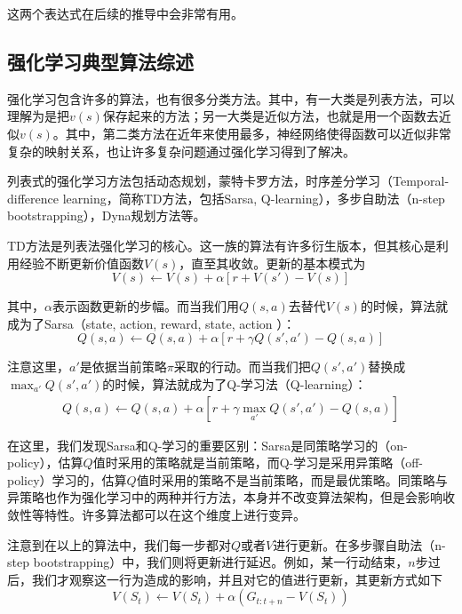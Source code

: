     \par 这两个表达式在后续的推导中会非常有用。
    
  \subsection{强化学习典型算法综述}
      强化学习包含许多的算法，也有很多分类方法。其中，有一大类是列表方法，可以理解为是把$v(s)$保存起来的方法；另一大类是近似方法，也就是用一个函数去近似$v(s)$\cite{Sutton_book}。其中，第二类方法在近年来使用最多，神经网络使得函数可以近似非常复杂的映射关系，也让许多复杂问题通过强化学习得到了解决。\par
      列表式的强化学习方法包括动态规划\cite{Bellman_DP}，蒙特卡罗方法，时序差分学习（Temporal-difference learning，简称TD方法，包括Sarsa\cite{Sutton_book}, Q-learning\cite{Q_learning}）\cite{Sutton_problem_formulation}，多步自助法\cite{n_step_bootstrapping}（n-step bootstrapping），Dyna规划方法\cite{Sutton_book}等。\par
      TD方法是列表法强化学习的核心。这一族的算法有许多衍生版本，但其核心是利用经验不断更新价值函数$V(s)$，直至其收敛。更新的基本模式为
      $$ V(s) \gets V(s) + \alpha [r + V(s') - V(s)] $$
      \par 其中，$\alpha$表示函数更新的步幅。而当我们用$Q(s, a)$去替代$V(s)$的时候，算法就成为了Sarsa（state, action, reward, state, action \cite{deepRL_overview}）：
      $$ Q(s, a) \gets Q(s, a) + \alpha [r + \gamma Q(s', a') - Q(s, a)] $$
      \par 注意这里，$a'$是依据当前策略$\pi$采取的行动。而当我们把$Q(s', a')$替换成$\max_{a'} Q(s', a')$的时候，算法就成为了Q-学习法（Q-learning）：
      \begin{align}
      \label{eq:Q_learning}
        Q(s, a) \gets Q(s, a) + \alpha [r + \gamma \max_{a'} Q(s', a') - Q(s, a)]
      \end{align}
      \par 在这里，我们发现Sarsa和Q-学习的重要区别：Sarsa是同策略学习的（on-policy），估算$Q$值时采用的策略就是当前策略，而Q-学习是采用异策略（off-policy）学习的，估算$Q$值时采用的策略不是当前策略，而是最优策略。同策略与异策略也作为强化学习中的两种并行方法，本身并不改变算法架构，但是会影响收敛性等特性。许多算法都可以在这个维度上进行变异。\par
      注意到在以上的算法中，我们每一步都对$Q$或者$V$进行更新。在多步骤自助法（n-step bootstrapping）中，我们则将更新进行延迟。例如，某一行动结束，$n$步过后，我们才观察这一行为造成的影响，并且对它的值进行更新，其更新方式如下
      $$ V(S_t) \gets V(S_t) + \alpha(G_{t:t+n} - V(S_t)) $$
